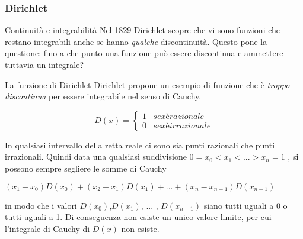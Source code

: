 \begin{frame}[label=Dirichlet]
  \frametitle{Dirichlet}
  \begin{block}{Continuità e integrabilità}    
  Nel 1829 Dirichlet scopre che vi sono funzioni che restano integrabili anche se hanno \textit{qualche} discontinuità.
  Questo pone la questione: fino a che punto una funzione può essere discontinua e ammettere tuttavia un integrale?
  \end{block}  
  \begin{block}{La funzione di Dirichlet}    
    Dirichlet propone un esempio di funzione che è \textit{troppo discontinua} per essere integrabile nel senso di Cauchy.
    
    \begin{equation*}
      D(x) =
      \begin{cases*}
        1 & se x è razionale \\
        0 & se x è irrazionale
      \end{cases*}
    \end{equation*}

    In qualsiasi intervallo della retta reale ci sono sia punti razionali che punti irrazionali. Quindi data una qualsiasi suddivisione
    $ 0 = x_0 < x_1 < ... > x_n = 1$ , si possono sempre segliere le somme di Cauchy \begin{center}
      $(x_1 - x_0)D(x_0) + (x_2 - x_1)D(x_1) + ... + (x_n - x_{n-1})D(x_{n-1})$
    \end{center}
    in modo che i valori $D(x_0)$,$D(x_1)$, ... , $D(x_{n-1})$ siano tutti uguali a 0 o tutti uguali a 1. Di conseguenza non esiste un 
    unico valore limite, per cui l'integrale di Cauchy di $D(x)$ \alert{non esiste}.
  \end{block}  
  
\end{frame}



